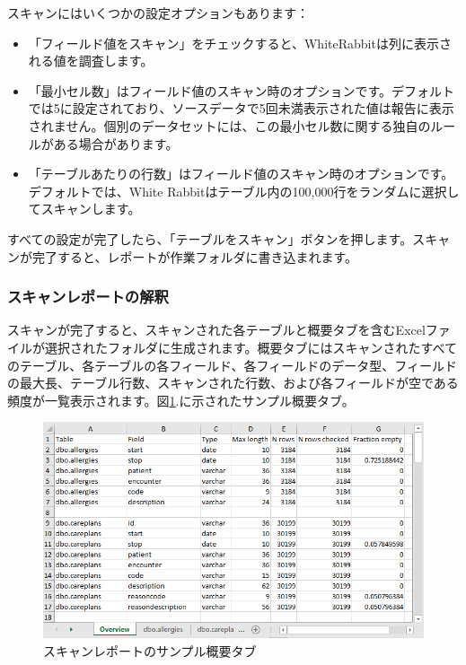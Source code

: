 \documentclass[
  11pt]{book}
\providecommand{\tightlist}{%
  \setlength{\itemsep}{0pt}\setlength{\parskip}{0pt}}
\theoremstyle{definition}
\theoremstyle{definition}
\theoremstyle{definition}
\theoremstyle{definition}
\theoremstyle{remark}
\begin{document}
スキャンにはいくつかの設定オプションもあります：

\begin{itemize}
\tightlist
\item
  「フィールド値をスキャン」をチェックすると、WhiteRabbitは列に表示される値を調査します。
\item
  「最小セル数」はフィールド値のスキャン時のオプションです。デフォルトでは5に設定されており、ソースデータで5回未満表示された値は報告に表示されません。個別のデータセットには、この最小セル数に関する独自のルールがある場合があります。
\item
  「テーブルあたりの行数」はフィールド値のスキャン時のオプションです。デフォルトでは、White Rabbitはテーブル内の100,000行をランダムに選択してスキャンします。
\end{itemize}

すべての設定が完了したら、「テーブルをスキャン」ボタンを押します。スキャンが完了すると、レポートが作業フォルダに書き込まれます。

\subsubsection*{スキャンレポートの解釈}\label{ux30b9ux30adux30e3ux30f3ux30ecux30ddux30fcux30c8ux306eux89e3ux91c8}

スキャンが完了すると、スキャンされた各テーブルと概要タブを含むExcelファイルが選択されたフォルダに生成されます。概要タブにはスキャンされたすべてのテーブル、各テーブルの各フィールド、各フィールドのデータ型、フィールドの最大長、テーブル行数、スキャンされた行数、および各フィールドが空である頻度が一覧表示されます。図\ref{fig:ScanOverviewTab}.に示されたサンプル概要タブ。

\begin{figure}

{\centering \includegraphics[width=1\linewidth]{images/ExtractTransformLoad/ScanOverviewTab} 

}

\caption{スキャンレポートのサンプル概要タブ}\label{fig:ScanOverviewTab}
\end{figure}
\end{document}
